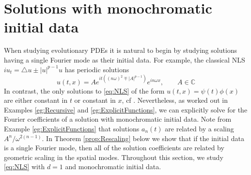 \documentclass{article}
\newcommand{\C}{\mathbb{C}}
\begin{document}
 
 
 
 
 

\section{Solutions with monochromatic initial data}
\label{sec:Monochromatic}
When studying evolutionary PDEs it is natural to begin by studying solutions having a single Fourier mode as their initial data. 
For example, the classical NLS $i u_t = \triangle u \pm |u|^{p-1} u$ has periodic solutions 
\[
 u(t,x) = A e^{it(  (n\omega)^2 \mp |A|^{p-1} )} e^{i n\omega x} , \qquad A \in \C
\]  
In contrast, the only solutions to \eqref{eq:NLS} of the form $ u(t,x) = \psi(t) \phi(x)$ are either constant in $ t$ or constant in $x$, cf \cite{jaquette2020global}. 
Nevertheless, as worked out in Examples \ref{eg:Recursive} and  \ref{eg:ExplicitFunctions}, we can explicitly solve for the Fourier coefficients of a solution with monochromatic initial data. 
Note from Example \ref{eg:ExplicitFunctions}  that solutions $a_n(t)$ are related by a scaling $ A^n / \omega^{2(n-1)}$. 
In Theorem \ref{prop:Rescaling} below we show that if the initial data is a single Fourier mode, then all of the solution coefficients are related by geometric scaling in the spatial modes. 
Throughout  this section, we study \eqref{eq:NLS} with $d=1$ and monochromatic initial data.  
 
\end{document}
